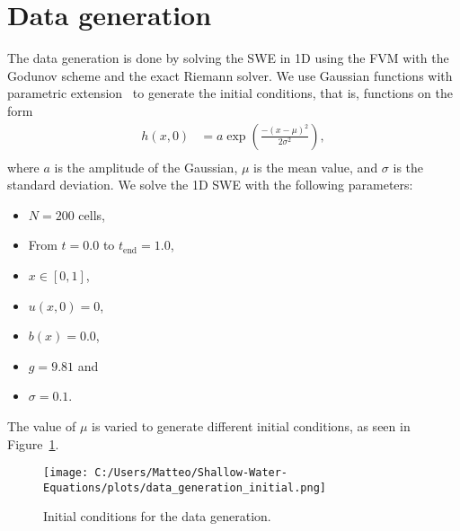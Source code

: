 \section{Data generation}
The data generation is done by solving the SWE in 1D using the FVM with the Godunov scheme and the exact Riemann solver.
We use Gaussian functions with parametric extension~\cite{Gaussian} to generate the initial conditions, that is, functions on the form
\begin{align*}
    h(x,0) &= a \exp{\left(\frac{-{(x-\mu)}^2}{2\sigma^2}\right)}, \\
\end{align*}
where $a$ is the amplitude of the Gaussian, $\mu$ is the mean value, and $\sigma$ is the standard deviation.
We solve the 1D SWE with the following parameters:
\begin{itemize}
    \item $N = 200$ cells,
    \item From $t = 0.0$ to $t_{\text{end}} = 1.0$,
    \item $x \in [0, 1]$,
    \item $u(x,0) = 0$,
    \item $b(x) = 0.0$,
    \item $g = 9.81$ and
    \item $\sigma = 0.1$.
\end{itemize}
The value of $\mu$ is varied to generate different initial conditions, as seen in Figure~\ref{fig:data_generation_initial}.
\begin{figure}[H]
    \centering
    \texttt{[image: C:/Users/Matteo/Shallow-Water-Equations/plots/data\_generation\_initial.png]}
    \caption{Initial conditions for the data generation.}\label{fig:data_generation_initial}
\end{figure}



